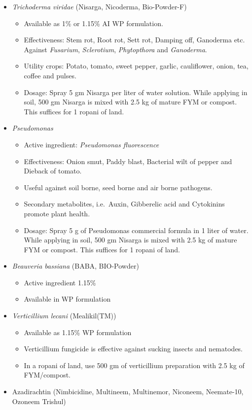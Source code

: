 \documentclass[
  openany]{book}
\providecommand{\tightlist}{%
  \setlength{\itemsep}{0pt}\setlength{\parskip}{0pt}}
\begin{document}
\begin{itemize}
\tightlist
\item
  \emph{Trichoderma viridae} (Nisarga, Nicoderma, Bio-Powder-F)

  \begin{itemize}
  \tightlist
  \item
    Available as 1\% or 1.15\% AI WP formulation.
  \item
    Effectiveness: Stem rot, Root rot, Sett rot, Damping off, Ganoderma etc. Against \emph{Fusarium}, \emph{Sclerotium}, \emph{Phytopthora} and \emph{Ganoderma}.
  \item
    Utility crops: Potato, tomato, sweet pepper, garlic, cauliflower, onion, tea, coffee and pulses.
  \item
    Dosage: Spray 5 gm Nisarga per liter of water solution. While applying in soil, 500 gm Nisarga is mixed with 2.5 kg of mature FYM or compost. This suffices for 1 ropani of land.
  \end{itemize}
\item
  \emph{Pseudomonas}

  \begin{itemize}
  \tightlist
  \item
    Active ingredient: \emph{Pseudomonas fluorescence}
  \item
    Effectiveness: Onion smut, Paddy blast, Bacterial wilt of pepper and Dieback of tomato.
  \item
    Useful against soil borne, seed borne and air borne pathogens.
  \item
    Secondary metabolites, i.e.~Auxin, Gibberelic acid and Cytokinins promote plant health.
  \item
    Dosage: Spray 5 g of Pseudomonas commercial formula in 1 liter of water. While applying in soil, 500 gm Nisarga is mixed with 2.5 kg of mature FYM or compost. This suffices for 1 ropani of land.
  \end{itemize}
\item
  \emph{Beauveria bassiana} (BABA, BIO-Powder)

  \begin{itemize}
  \tightlist
  \item
    Active ingredient 1.15\%
  \item
    Available in WP formulation
  \end{itemize}
\item
  \emph{Verticillium lecani} (Mealikil(TM))

  \begin{itemize}
  \tightlist
  \item
    Available as 1.15\% WP formulation
  \item
    Verticillium fungicide is effective against sucking insects and nematodes.
  \item
    In a ropani of land, use 500 gm of verticillium preparation with 2.5 kg of FYM/compost.
  \end{itemize}
\item
  Azadirachtin (Nimbicidine, Multineem, Multinemor, Niconeem, Neemate-10, Ozoneem Trishul)


\end{itemize}
\end{document}
